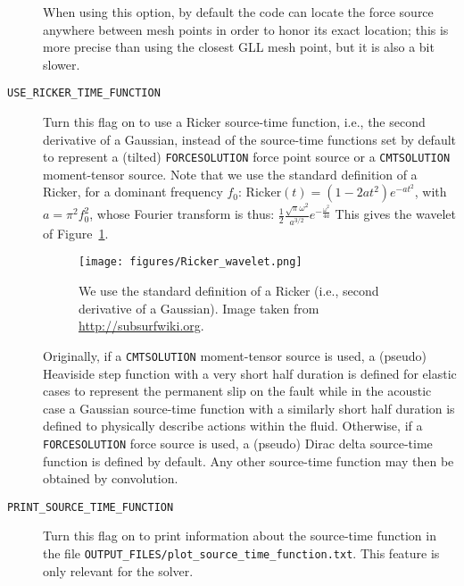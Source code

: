 \begin{description}
When using this option, by default the code can locate the force source
anywhere between mesh points in order to honor its exact location; this
is more precise than using the closest GLL mesh point, but it is also a bit slower.
\item [{\texttt{USE\_RICKER\_TIME\_FUNCTION}}] Turn this flag on to use
a Ricker source-time function, i.e., the second derivative of a Gaussian, instead of the source-time functions
set by default to represent a (tilted) \texttt{FORCESOLUTION} force
point source or a \texttt{CMTSOLUTION} moment-tensor source.
Note that we use the standard definition of a Ricker, for a dominant frequency $f_0$:
$\mathrm{Ricker}(t) = (1 - 2 a t^2) e^{-a t^2}$, with $a = \pi^2 f_0^2$,
whose Fourier transform is thus:
$\frac{1}{2} \frac{\sqrt{\pi}\omega^2}{a^{3/2}}e^{-\frac{\omega^2}{4 a}}$
This gives the wavelet of Figure~\ref{fig:RickerWavelet}.
\begin{figure}[htbp]
\centering
\texttt{[image: figures/Ricker\_wavelet.png]}
\caption{We use the standard definition of a Ricker (i.e., second derivative of a Gaussian). Image taken from \url{http://subsurfwiki.org}.}
\label{fig:RickerWavelet}
\end{figure}
Originally, if a \texttt{CMTSOLUTION} moment-tensor source is used, a (pseudo)
Heaviside step function with a very short half duration is defined
for elastic cases to represent the permanent slip on the fault while
in the acoustic case a Gaussian source-time function with a similarly
short half duration is defined to physically describe actions within
the fluid. Otherwise, if a \texttt{FORCESOLUTION} force source is
used, a (pseudo) Dirac delta source-time function is defined by default.
Any other source-time function may then be obtained by convolution.
\item [{\texttt{PRINT\_SOURCE\_TIME\_FUNCTION}}] Turn this flag on to print
information about the source-time function in the file \texttt{OUTPUT\_FILES/plot\_source\_time\_function.txt}.
This feature is only relevant for the solver.
%
\end{description}

